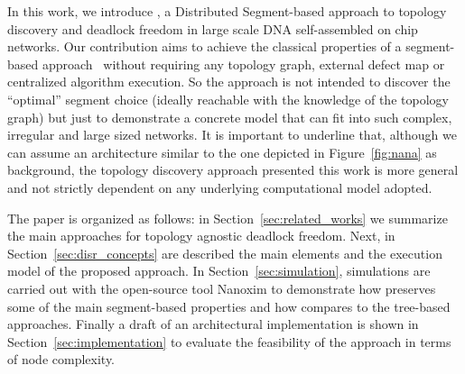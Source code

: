 In this work, we introduce \disr{}, a Distributed Segment-based
approach to topology discovery and deadlock freedom in large scale DNA
self-assembled on chip networks. Our contribution aims to achieve the
classical properties of a segment-based approach~\cite{mejia_ipdps06}
without requiring any topology graph, external defect map or
centralized algorithm execution.  So the \disr{} approach is not
intended to discover the ``optimal'' segment choice (ideally reachable
with the knowledge of the topology graph) but just to demonstrate a
concrete model that can fit into such complex, irregular and large
sized networks.  It is important to underline that, although we can
assume an architecture similar to the one depicted in
Figure~\ref{fig:nana} as background, the \disr{} topology discovery
approach presented this work is more general and not strictly
dependent on any underlying computational model adopted.

The paper is organized as follows: in Section~\ref{sec:related_works}
we summarize the main approaches for topology agnostic deadlock
freedom. Next, in
Section~\ref{sec:disr_concepts} are described the main elements and
the execution model of the proposed approach. In Section~\ref{sec:simulation},
simulations are carried out with the open-source tool Nanoxim to
demonstrate how \disr{} preserves some of the main segment-based
properties and how compares to the tree-based approaches. Finally a
draft of an architectural implementation is shown in
Section~\ref{sec:implementation} to evaluate the feasibility of the
approach in terms of node complexity.

